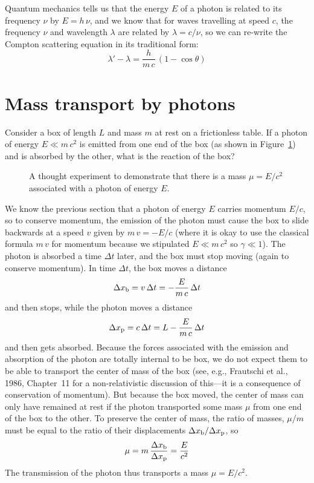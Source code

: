 Quantum mechanics tells us that the energy $E$ of a photon is related
to its frequency $\nu$ by $E=h\,\nu$, and we know that for waves
travelling at speed $c$, the frequency $\nu$ and wavelength $\lambda$
are related by $\lambda=c/\nu$, so we can re-write the Compton
scattering equation in its traditional form:
\begin{equation}
\lambda'-\lambda = \frac{h}{m\,c}\,(1-\cos\theta)
\end{equation}



\section{Mass transport by photons}
\label{sec:masstransport}

Consider a box of length $L$ and mass $m$ at rest on a frictionless
table.  If a photon of energy $E\ll m\,c^2$ is emitted from one end of
the box (as shown in Figure~\ref{fig:photonmass}) and is absorbed by
the other, what is the reaction of the box?
\begin{figure}
\caption[A demonstration that there is a mass associated with the
energy in a photon]{A thought experiment to demonstrate that there is
a mass $\mu=E/c^2$ associated with a photon of energy $E$.}
\label{fig:photonmass}
\end{figure}

We know the previous section that a photon of energy $E$ carries
momentum $E/c$, so to conserve momentum, the emission of the photon
must cause the box to slide backwards at a speed $v$ given by
$m\,v=-E/c$ (where it is okay to use the classical formula $m\,v$ for
momentum because we stipulated $E\ll m\,c^2$ so $\gamma\ll 1$). The
photon is absorbed a time $\Delta t$ later, and the box must stop
moving (again to conserve momentum).  In time $\Delta t$, the box
moves a distance
\begin{equation}
\Delta x_{\rm b} = v\,\Delta t = -\frac{E}{m\,c}\,\Delta t
\end{equation}
and then stops, while the photon moves a distance
\begin{equation}
\Delta x_{\rm p} = c\,\Delta t = L-\frac{E}{m\,c}\,\Delta t
\end{equation}
and then gets absorbed.  Because the forces associated with the
emission and absorption of the photon are totally internal to be box,
we do not expect them to be able to transport the center of mass of
the box (see, e.g., Frautschi et al., 1986, Chapter~11 for a
non-relativistic discussion of this---it is a consequence of
conservation of momentum).  But because the box moved, the center of
mass can only have remained at rest if the photon transported some
mass $\mu$ from one end of the box to the other.  To preserve the
center of mass, the ratio of masses, $\mu/m$ must be equal to the
ratio of their displacements $\Delta x_{\rm b}/\Delta x_{\rm p}$, so
\begin{equation}
\mu = m\,\frac{\Delta x_{\rm b}}{\Delta x_{\rm p}}
= \frac{E}{c^2}
\end{equation}
The transmission of the photon thus transports a mass $\mu=E/c^2$.

